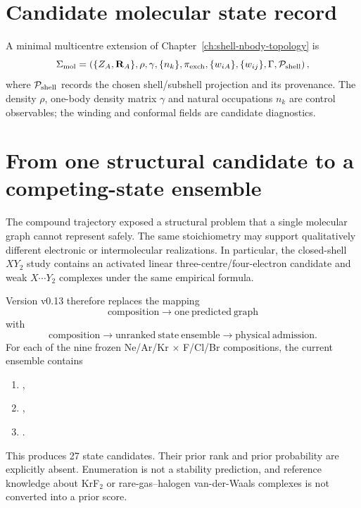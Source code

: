 \section{Candidate molecular state record}
A minimal multicentre extension of Chapter~\ref{ch:shell-nbody-topology} is
\begin{equation}
\Sigma_{\rm mol}=\left(\{Z_A,\mathbf R_A\},\rho,\gamma,\{n_k\},\pi_{\rm exch},\{w_{iA}\},\{w_{ij}\},\Gamma,\mathcal P_{\rm shell}\right),
\end{equation}
where $\mathcal P_{\rm shell}$ records the chosen shell/subshell projection and its provenance.  The density $\rho$, one-body density matrix $\gamma$ and natural occupations $n_k$ are control observables; the winding and conformal fields are candidate diagnostics.

\section{From one structural candidate to a competing-state ensemble}
The compound trajectory exposed a structural problem that a single molecular graph cannot represent safely.  The same stoichiometry may support qualitatively different electronic or intermolecular realizations.  In particular, the closed-shell $XY_2$ study contains an activated linear three-centre/four-electron candidate and weak $X\cdots Y_2$ complexes under the same empirical formula.

Version v0.13 therefore replaces the mapping
\begin{equation}
\mathrm{composition}\longrightarrow\mathrm{one\ predicted\ graph}
\end{equation}
with
\begin{equation}
\mathrm{composition}\longrightarrow\mathrm{unranked\ state\ ensemble}
\longrightarrow\mathrm{physical\ admission}.
\end{equation}
For each of the nine frozen Ne/Ar/Kr $\times$ F/Cl/Br compositions, the current ensemble contains
\begin{enumerate}
\item {},
\item {},
\item {}.
\end{enumerate}
This produces 27 state candidates.  Their prior rank and prior probability are explicitly absent.  Enumeration is not a stability prediction, and reference knowledge about KrF$_2$ or rare-gas--halogen van-der-Waals complexes is not converted into a prior score.

